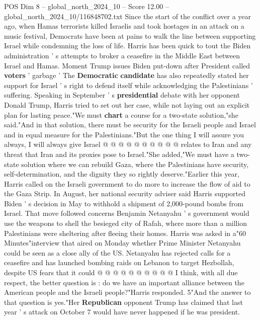 \begin{textsample}{POS Dim 8 – global\_north\_2024\_10 – Score 12.00 – global\_north\_2024\_10/116848702.txt}  \label{ex:f8_pos_164}
Since the start of the conflict over a year ago, when Hamas terrorists killed Israelis and took hostages in an attack on a music festival, Democrats have been at pains to walk the line between supporting Israel while condemning the loss of life.
Harris has been quick to tout the Biden administration ' s attempts to broker a ceasefire in the Middle East between Israel and Hamas.
Moment Trump issues Biden put-down after President called \textbf{voters} ' garbage ' The \textbf{Democratic} \textbf{candidate} has also repeatedly stated her support for Israel ' s right to defend itself while acknowledging the Palestinians ' suffering.
Speaking in September ' s \textbf{presidential} debate with her opponent Donald Trump, Harris tried to set out her case, while not laying out an explicit plan for lasting peace."We must \textbf{chart} a course for a two-state solution,"she said."And in that solution, there must be security for the Israeli people and Israel and in equal measure for the Palestinians."But the one thing I will assure you always, I will always give Israel @ @ @ @ @ @ @ @ @ @ relates to Iran and any threat that Iran and its proxies pose to Israel."She added,"We must have a two-state solution where we can rebuild Gaza, where the Palestinians have security, self-determination, and the dignity they so rightly deserve."Earlier this year, Harris called on the Israeli government to do more to increase the flow of aid to the Gaza Strip.
In August, her national security adviser said Harris supported Biden ' s decision in May to withhold a shipment of 2,000-pound bombs from Israel.
That move followed concerns Benjamin Netanyahu ' s government would use the weapons to shell the besieged city of Rafah, where more than a million Palestinians were sheltering after fleeing their homes.
Harris was asked in a"60 Minutes"interview that aired on Monday whether Prime Minister Netanyahu could be seen as a close ally of the US.
Netanyahu has rejected calls for a ceasefire and has launched bombing raids on Lebanon to target Hezbollah, despite US fears that it could @ @ @ @ @ @ @ @ @ @ I think, with all due respect, the better question is : do we have an important alliance between the American people and the Israeli people?"Harris responded. 5"And the answer to that question is yes."Her \textbf{Republican} opponent Trump has claimed that last year ' s attack on October 7 would have never happened if he was president.

\end{textsample}
